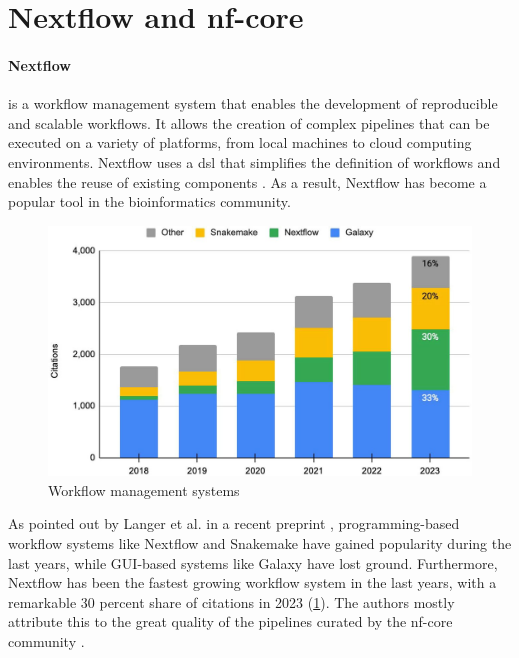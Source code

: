 \section{Nextflow and nf-core}
\label{sec:nextflow_and_nf-core}
\paragraph{Nextflow} is a workflow management system that enables the
development of reproducible and scalable workflows.
It allows the creation of complex pipelines that can be executed on a variety
of platforms, from local machines to cloud computing environments.
Nextflow uses a \gls{dsl} that simplifies the definition of workflows and
enables the reuse of existing components \supercite{di_tommaso_nextflow_2017}.
As a result, Nextflow has become a popular tool in the bioinformatics
community.

\begin{figure}[ht]
    \centering

    \includegraphics[width=\textwidth]{chapters/3_materials_and_methods/figures/nextflow_usage.jpg}
    \caption{Workflow management systems} %
    \label{fig:nextflow_usage}
\end{figure}

As pointed out by Langer et al.
in a recent preprint
\supercite{langer_empowering_2024}, programming-based workflow systems like
Nextflow and Snakemake have gained popularity during the last years, while
GUI-based systems like Galaxy have lost ground.
Furthermore, Nextflow has been the fastest growing workflow system in the last
years, with a remarkable 30 percent share of citations in 2023
(\cref{fig:nextflow_usage}).
The authors mostly attribute this to the great quality of the pipelines curated
by the nf-core community
\supercite{langer_empowering_2024,grayson_automatic_2023}.

